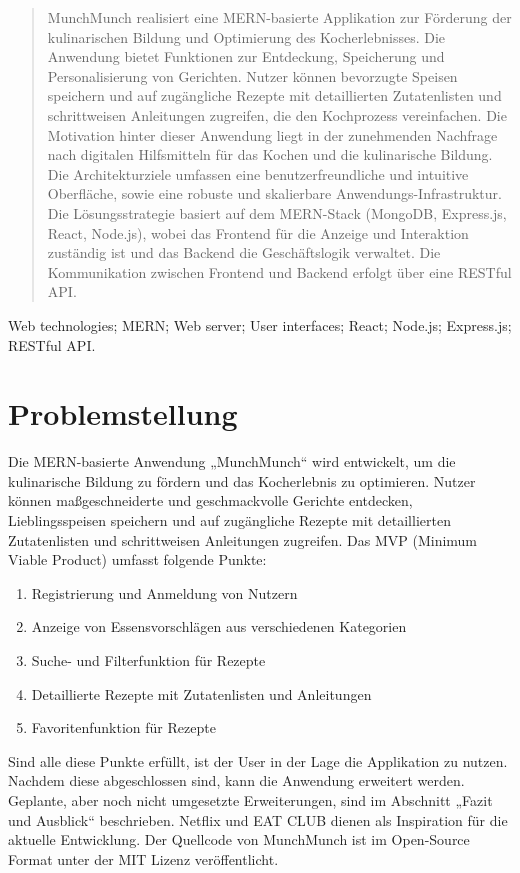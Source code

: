 \documentclass[conference,a4paper,flushend]{cs-techrep}
\begin{document}
\selectlanguage{\cstechrepLang}

\maketitle

\begin{abstract}
MunchMunch realisiert eine MERN-basierte Applikation zur Förderung der kulinarischen Bildung und Optimierung des Kocherlebnisses. Die Anwendung bietet Funktionen zur Entdeckung, Speicherung und Personalisierung von Gerichten. Nutzer können bevorzugte Speisen speichern und auf zugängliche Rezepte mit detaillierten Zutatenlisten und schrittweisen Anleitungen zugreifen, die den Kochprozess vereinfachen. Die Motivation hinter dieser Anwendung liegt in der zunehmenden Nachfrage nach digitalen Hilfsmitteln für das Kochen und die kulinarische Bildung. Die Architekturziele umfassen eine benutzerfreundliche und intuitive Oberfläche, sowie eine robuste und skalierbare Anwendungs-Infrastruktur. Die Lösungsstrategie basiert auf dem MERN-Stack (MongoDB, Express.js, React, Node.js), wobei das Frontend für die Anzeige und Interaktion zuständig ist und das Backend die Geschäftslogik verwaltet. Die Kommunikation zwischen Frontend und Backend erfolgt über eine RESTful API.
\end{abstract}

\begin{IEEEkeywords}
Web technologies; MERN; Web server; User interfaces; React; Node.js; Express.js; RESTful API.
\end{IEEEkeywords}

\section{Problemstellung}
Die MERN-basierte Anwendung „MunchMunch“ wird entwickelt, um die kulinarische Bildung zu fördern und das Kocherlebnis zu optimieren. Nutzer können maßgeschneiderte und geschmackvolle Gerichte entdecken, Lieblingsspeisen speichern und auf zugängliche Rezepte mit detaillierten Zutatenlisten und schrittweisen Anleitungen zugreifen.
Das MVP (Minimum Viable Product) umfasst folgende Punkte:
\begin{enumerate}
\item  Registrierung und Anmeldung von Nutzern
\item  Anzeige von Essensvorschlägen aus verschiedenen Kategorien
\item  Suche- und Filterfunktion für Rezepte
\item  Detaillierte Rezepte mit Zutatenlisten und Anleitungen
\item  Favoritenfunktion für Rezepte
\end{enumerate}
Sind alle diese Punkte erfüllt, ist der User in der Lage die Applikation zu nutzen. Nachdem diese abgeschlossen sind, kann die Anwendung erweitert werden. Geplante, aber noch nicht umgesetzte Erweiterungen, sind im Abschnitt „Fazit und Ausblick“ beschrieben.
Netflix\cite{Netflix} und EAT CLUB\cite{EATCLUB} dienen als Inspiration für die aktuelle Entwicklung. Der Quellcode von MunchMunch ist im Open-Source Format unter der MIT Lizenz veröffentlicht.
\end{document}
